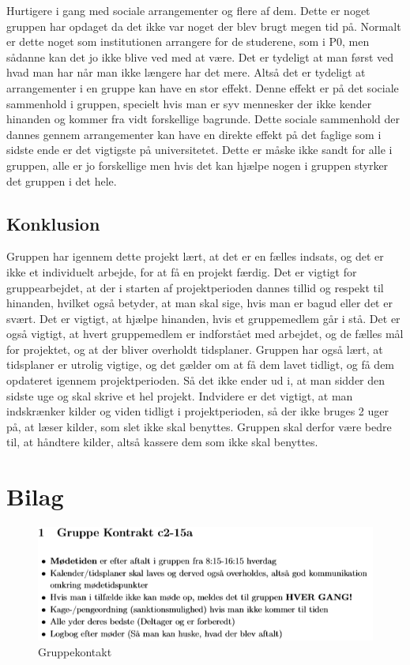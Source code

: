 Hurtigere i gang med sociale arrangementer og flere af dem. Dette er noget gruppen har opdaget da det ikke var noget der blev brugt megen tid på. Normalt er dette noget som institutionen arrangere for de studerene, som i P0, men sådanne kan det jo ikke blive ved med at være. Det er tydeligt at man først ved hvad man har når man ikke længere har det mere. Altså det er tydeligt at arrangementer i en gruppe kan have en stor effekt. Denne effekt er på det sociale sammenhold i gruppen, specielt hvis man er syv mennesker der ikke kender hinanden og kommer fra vidt forskellige bagrunde. Dette sociale sammenhold der dannes gennem arrangementer kan have en direkte effekt på det faglige som i sidste ende er det vigtigste på universitetet. Dette er måske ikke sandt for alle i gruppen, alle er jo forskellige men hvis det kan hjælpe nogen i gruppen styrker det gruppen i det hele.

\section{Konklusion}

Gruppen har igennem dette projekt lært, at det er en fælles indsats, og det er ikke et individuelt arbejde, for at få en projekt færdig. Det er vigtigt for gruppearbejdet, at der i starten af projektperioden dannes tillid og respekt til hinanden, hvilket også betyder, at man skal sige, hvis man er bagud eller det er svært. Det er vigtigt, at hjælpe hinanden, hvis et gruppemedlem går i stå. Det er også vigtigt, at hvert gruppemedlem er indforstået med arbejdet, og de fælles mål for projektet, og at der bliver overholdt tidsplaner.
Gruppen har også lært, at tidsplaner er utrolig vigtige, og det gælder om at få dem lavet tidligt, og få dem opdateret igennem projektperioden. Så det ikke ender ud i, at man sidder den sidste uge og skal skrive et hel projekt. Indvidere er det vigtigt, at man indskrænker kilder og viden tidligt i projektperioden, så der ikke bruges 2 uger på, at læser kilder, som slet ikke skal benyttes. Gruppen skal derfor være bedre til, at håndtere kilder, altså kassere dem som ikke skal benyttes.

\chapter{Bilag}

\begin{figure} [H]
\includegraphics[scale=1]{Gruppekontrakt}
\caption{Gruppekontakt}
\end{figure}

